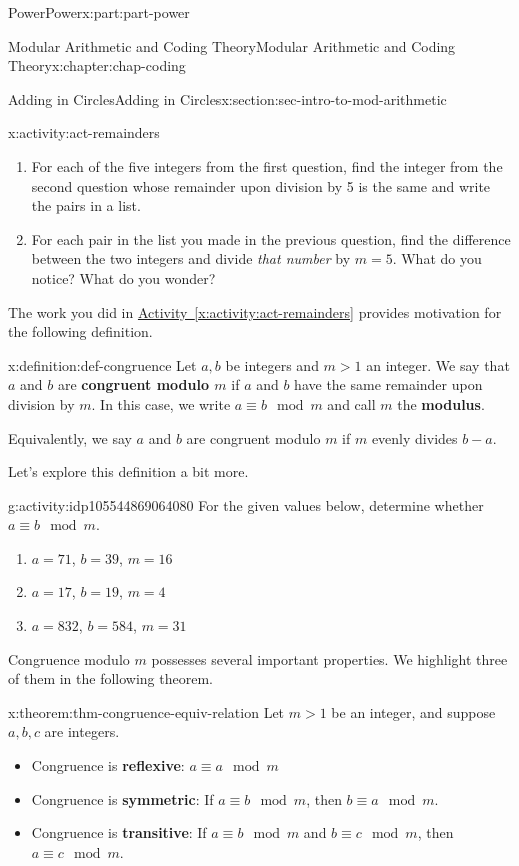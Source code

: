 \documentclass[oneside,10pt,]{book}
\newcommand{\xreffont}{\relax}
\newcommand{\terminology}[1]{\textbf{#1}}
\numberwithin{equation}{section}
\newcommand{\gt}{>}
\begin{document}
\begin{partptx}{Power}{}{Power}{}{}{x:part:part-power}
\begin{chapterptx}{Modular Arithmetic and Coding Theory}{}{Modular Arithmetic and Coding Theory}{}{}{x:chapter:chap-coding}
\begin{sectionptx}{Adding in Circles}{}{Adding in Circles}{}{}{x:section:sec-intro-to-mod-arithmetic}
\begin{activity}{}{x:activity:act-remainders}
\begin{enumerate}
\item{}For each of the five integers from the first question, find the integer from the second question whose remainder upon division by 5 is the same and write the pairs in a list.%
\item{}For each pair in the list you made in the previous question, find the difference between the two integers and divide \emph{that number} by \(m=5\). What do you notice? What do you wonder?%
\end{enumerate}
\end{activity}%
The work you did in \hyperref[x:activity:act-remainders]{Activity~{\xreffont\ref{x:activity:act-remainders}}} provides motivation for the following definition.%
\begin{definition}{}{x:definition:def-congruence}%
%
%
Let \(a,b\) be integers and \(m \gt 1\) an integer. We say that \(a\) and \(b\) are \terminology{congruent modulo \(m\)} if \(a\) and \(b\) have the same remainder upon division by \(m\). In this case, we write \(a\equiv b\mod m\) and call \(m\) the \terminology{modulus}.%
\par
Equivalently, we say \(a\) and \(b\) are congruent modulo \(m\) if \(m\) evenly divides \(b-a\).%
\end{definition}
Let's explore this definition a bit more.%
\begin{activity}{}{g:activity:idp105544869064080}%
For the given values below, determine whether \(a \equiv b\mod m\).%
%
\begin{enumerate}
\item{}\(a = 71\), \(b = 39\), \(m= 16\)%
\item{}\(a = 17\), \(b = 19\), \(m = 4\)%
\item{}\(a = 832\), \(b = 584\), \(m= 31\)%
\end{enumerate}
\end{activity}%
Congruence modulo \(m\) possesses several important properties. We highlight three of them in the following theorem.%
\begin{theorem}{}{}{x:theorem:thm-congruence-equiv-relation}%
Let \(m\gt 1\) be an integer, and suppose \(a,b,c\) are integers.%
%
\begin{itemize}[label=\textbullet]
\item{}Congruence is \terminology{reflexive}: \(a\equiv a\mod m\)%
\item{}Congruence is \terminology{symmetric}: If \(a\equiv b\mod m\), then \(b\equiv a\mod m\).%
\item{}Congruence is \terminology{transitive}: If \(a\equiv b\mod m\) and \(b\equiv c\mod m\), then \(a\equiv c\mod m\).%

\end{itemize}
\end{theorem}
\end{sectionptx}
\end{chapterptx}
\end{partptx}
\end{document}
